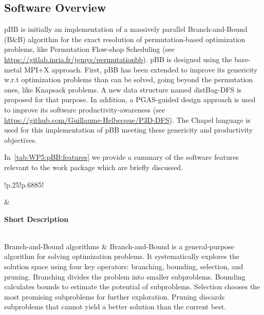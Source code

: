 \subsection{Software Overview}
\label{sec:WP5:pBB:summary}

pBB is initially an implementation of a massively parallel Branch-and-Bound (B\&B) algorithm for the exact resolution of permutation-based optimization problems, like Permutation Flow-shop Scheduling (see \url{https://gitlab.inria.fr/jgmys/permutationbb}). pBB is designed using the bare-metal MPI+X approach. 
First, pBB has been extended to improve its genericity w.r.t optimization problems than can be solved, going beyond the permutation ones, like Knapsack problems. A new data structure named distBag-DFS is proposed for that purpose. 
In addition, a PGAS-guided design approach is used to improve its software productivity-awareness (see \url{https://github.com/Guillaume-Helbecque/P3D-DFS}). The Chapel language is used for this implementation of pBB meeting these genericity and productivity objectives. 

In~\cref{tab:WP5:pBB:features} we provide a summary of the software features relevant to the work package which are briefly discussed.

\begin{table}[h!]
    \centering
    { 
        \setlength{\parindent}{0pt}
        \def\arraystretch{1.25}
        {
            \fontsize{9}{11}\selectfont
            \begin{tabular}{!{\color{numpexgray}\vrule}p{.25\linewidth}!{\color{numpexgray}\vrule}p{.6885\linewidth}!{\color{numpexgray}\vrule}}
    
     &  {\rule{0pt}{2.5ex}\color{white}\bf Short Description }\\ 
    
 Branch-and-Bound algorithms & Branch-and-Bound is a general-purpose algorithm for solving optimization problems. It systematically explores the solution space using four key operators: branching, bounding, selection, and pruning. Branching divides the problem into smaller subproblems. Bounding calculates bounds to estimate the potential of subproblems. Selection chooses the most promising subproblems for further exploration. Pruning discards subproblems that cannot yield a better solution than the current best. \\
\end{tabular}
        }
    }
    \caption{WP5: pBB Features}
    \label{tab:WP5:pBB:features}
\end{table}

